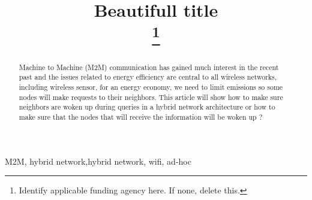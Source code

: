 \documentclass[conference]{IEEEtran}
\begin{document}
\title{Beautifull title\\
\thanks{Identify applicable funding agency here. If none, delete this.}
}

\author{
\and
{}
\and
{}
}

\maketitle

\begin{abstract}
Machine to Machine (M2M) communication has gained much interest in the recent past and the issues related to energy efficiency are central to all wireless networks, including wireless sensor, for an energy economy, we need to limit emissions so some nodes will make requests to their neighbors.  This article will show how to make sure neighbors are woken up during queries in a hybrid network architecture or how to make sure that the nodes that will receive the information will be woken up ?
\end{abstract}

\begin{IEEEkeywords}
M2M, hybrid network,hybrid network, wifi, ad-hoc
\end{IEEEkeywords}
\end{document}
